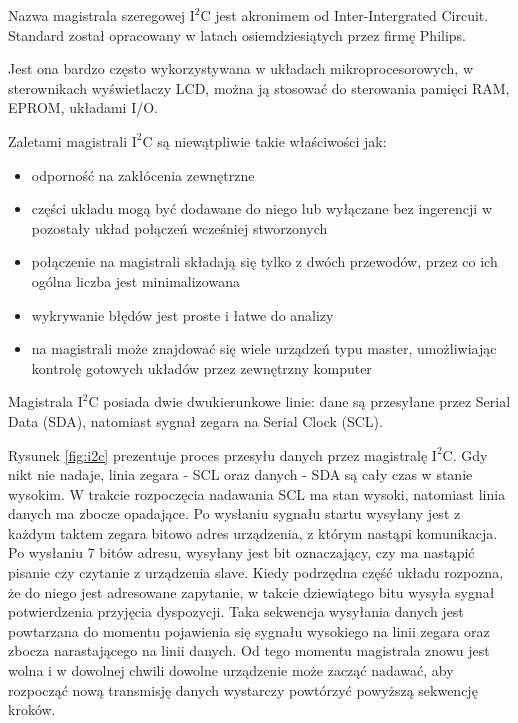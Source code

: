 Nazwa magistrala szeregowej $\mathrm{I^{2}C}$ jest akronimem od Inter-Intergrated Circuit. Standard został opracowany w latach osiemdziesiątych przez firmę Philips.

Jest ona bardzo często wykorzystywana w układach mikroprocesorowych, w sterownikach wyświetlaczy LCD, można ją stosować do sterowania pamięci RAM, EPROM, układami I/O.

Zaletami magistrali $\mathrm{I^{2}C}$ są niewątpliwie takie właściwości jak:

\begin{itemize}
\setlength{\itemsep}{2pt} 
\setlength{\parskip}{2pt} 
\setlength{\parsep}{2pt}
\item odporność na zakłócenia zewnętrzne
\item części układu mogą być dodawane do niego lub wyłączane bez ingerencji w pozostały układ połączeń wcześniej stworzonych
\item połączenie na magistrali składają się tylko z dwóch przewodów, przez co ich ogólna liczba jest minimalizowana
\item wykrywanie błędów jest proste i łatwe do analizy
\item na magistrali może znajdować się wiele urządzeń typu master, umożliwiając kontrolę gotowych układów przez zewnętrzny komputer
\end{itemize}


Magistrala $\mathrm{I^{2}C}$ posiada dwie dwukierunkowe linie: dane są przesyłane przez Serial Data (SDA), natomiast sygnał zegara na Serial Clock (SCL).


Rysunek \ref{fig:i2c} prezentuje proces przesyłu danych przez magistralę $\mathrm{I^{2}C}$. Gdy nikt nie nadaje, linia zegara - SCL oraz danych - SDA są cały czas w stanie wysokim. W trakcie rozpoczęcia nadawania SCL ma stan wysoki, natomiast linia danych ma zbocze opadające. Po wysłaniu sygnału startu wysyłany jest z każdym taktem zegara bitowo adres urządzenia, z którym nastąpi komunikacja. Po wysłaniu 7 bitów adresu, wysyłany jest bit oznaczający, czy ma nastąpić pisanie czy czytanie z urządzenia slave. Kiedy podrzędna część układu rozpozna, że do niego jest adresowane zapytanie, w takcie dziewiątego bitu wysyła sygnał potwierdzenia przyjęcia dyspozycji. Taka sekwencja wysyłania danych jest powtarzana do momentu pojawienia się sygnału wysokiego na linii zegara oraz zbocza narastającego na linii danych. Od tego momentu magistrala znowu jest wolna i w dowolnej chwili dowolne urządzenie może zacząć nadawać, aby rozpocząć nową transmisję danych wystarczy powtórzyć powyższą sekwencję kroków.

